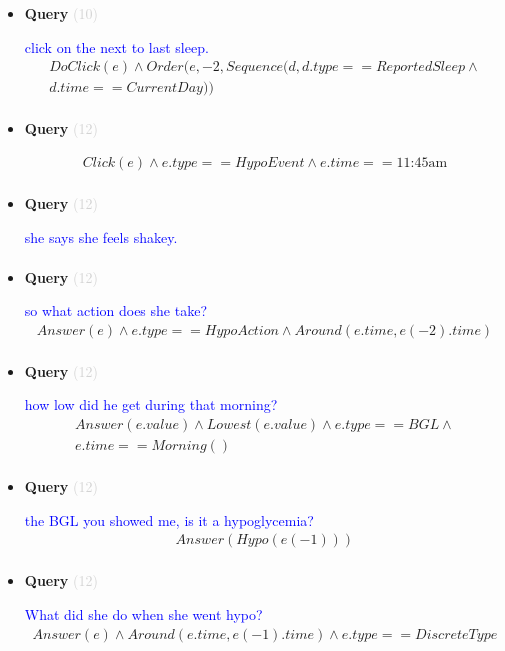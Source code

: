 \documentclass[11pt]{article}
\newcommand{\key}[1]{\textcolor{lightgray}{#1}}
\newcounter{CQuery}
\begin{document}
\begin{itemize}
\item
\textbf{Query\theCQuery} \key{(10)} \addtocounter{CQuery}{1}
\textcolor{blue}{ click on the next to last sleep. }
\begin{multline*}
DoClick(e) \wedge  Order(e, -2, Sequence(d, d.type==ReportedSleep \wedge \\ 
d.time==CurrentDay)) \\ 
\end{multline*}


\item
\textbf{Query\theCQuery} \key{(12)} \addtocounter{CQuery}{1}
\textcolor{blue}{  }
\begin{multline*}
Click(e) \wedge e.type == HypoEvent \wedge e.time == \mbox{11:45am} \\ 
\end{multline*}


\item
\textbf{Query\theCQuery} \key{(12)} \addtocounter{CQuery}{1}
\textcolor{blue}{ she says she feels shakey. }
\begin{multline*}
\end{multline*}


\item
\textbf{Query\theCQuery} \key{(12)} \addtocounter{CQuery}{1}
\textcolor{blue}{ so what action does she take? }
\begin{multline*}
Answer(e) \wedge e.type == HypoAction \wedge Around(e.time, e(-2).time) \\ 
\end{multline*}


\item
\textbf{Query\theCQuery} \key{(12)} \addtocounter{CQuery}{1}
\textcolor{blue}{ how low did he get during that morning? }
\begin{multline*}
Answer(e.value) \wedge Lowest(e.value) \wedge e.type==BGL \wedge \\ 
e.time==Morning() \\ 
\end{multline*}


\item
\textbf{Query\theCQuery} \key{(12)} \addtocounter{CQuery}{1}
\textcolor{blue}{ the BGL you showed me, is it a hypoglycemia? }
\begin{multline*}
Answer(Hypo(e(-1))) \\ 
\end{multline*}


\item
\textbf{Query\theCQuery} \key{(12)} \addtocounter{CQuery}{1}
\textcolor{blue}{ What did she do when she went hypo? }
\begin{multline*}
Answer(e) \wedge Around(e.time, e(-1).time) \wedge e.type==DiscreteType \\ 
\end{multline*}



\end{itemize}
\end{document}
